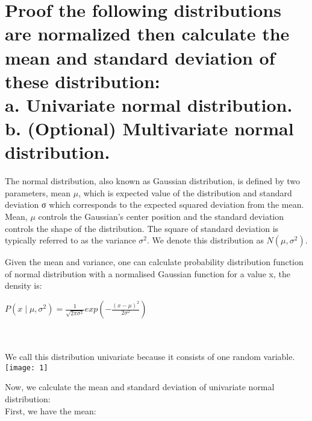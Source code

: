 \documentclass{article}
\begin{document}
\section{Proof the following distributions are normalized then calculate the mean and standard deviation of these distribution:\\
a. Univariate normal distribution.\\
b. (Optional) Multivariate normal distribution.}
The normal distribution, also known as Gaussian distribution, is defined by two parameters, mean $\mu$, which is expected value of the distribution and standard deviation σ which corresponds to the expected squared deviation from the mean. Mean, $\mu$ controls the Gaussian’s center position and the standard deviation controls the shape of the distribution. The square of standard deviation is typically referred to as the variance $\sigma{^2}$. We denote this distribution as $N(\mu, \sigma^{2})$.

Given the mean and variance, one can calculate probability distribution function of normal distribution with a normalised Gaussian function for a value x, the density is:

\centerline{$P(x \mid \mu, \sigma^{2}) = \frac{1}{\sqrt{2\pi \sigma^{2}}} exp \left(- \frac{(x - \mu)^{2}}{2\sigma^{2}} \right)$}\\

\\We call this distribution univariate because it consists of one random variable.\\

\texttt{[image: 1]}

Now, we calculate the mean and standard deviation of univariate normal distribution:\\
First, we have the mean: \\
\\
\end{document}
